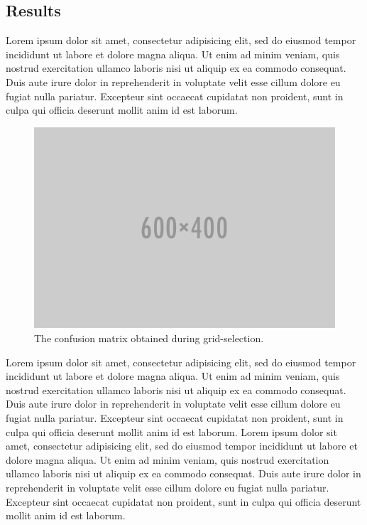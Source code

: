     \subsection{Results}
    Lorem ipsum dolor sit amet, consectetur adipisicing elit, sed do eiusmod tempor incididunt ut labore et dolore magna aliqua. Ut enim ad minim veniam, quis nostrud exercitation ullamco laboris nisi ut aliquip ex ea commodo consequat. Duis aute irure dolor in reprehenderit in voluptate velit esse cillum dolore eu fugiat nulla pariatur. Excepteur sint occaecat cupidatat non proident, sunt in culpa qui officia deserunt mollit anim id est laborum.

    \begin{figure}[thpb]
        \centering
        \includegraphics[width=\linewidth]{figures/placeholder.png}
        \caption{\label{fig:confussion}The confusion matrix obtained during grid-selection.}
    \end{figure}

    Lorem ipsum dolor sit amet, consectetur adipisicing elit, sed do eiusmod tempor incididunt ut labore et dolore magna aliqua. Ut enim ad minim veniam, quis nostrud exercitation ullamco laboris nisi ut aliquip ex ea commodo consequat. Duis aute irure dolor in reprehenderit in voluptate velit esse cillum dolore eu fugiat nulla pariatur. Excepteur sint occaecat cupidatat non proident, sunt in culpa qui officia deserunt mollit anim id est laborum.
    Lorem ipsum dolor sit amet, consectetur adipisicing elit, sed do eiusmod tempor incididunt ut labore et dolore magna aliqua. Ut enim ad minim veniam, quis nostrud exercitation ullamco laboris nisi ut aliquip ex ea commodo consequat. Duis aute irure dolor in reprehenderit in voluptate velit esse cillum dolore eu fugiat nulla pariatur. Excepteur sint occaecat cupidatat non proident, sunt in culpa qui officia deserunt mollit anim id est laborum.

